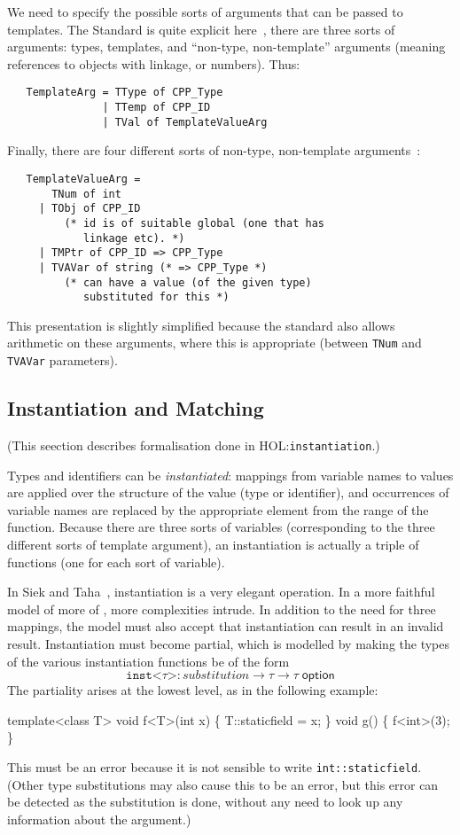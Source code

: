 \documentclass[11pt]{article}
\newcommand{\HOLfile}[1]{HOL:\texttt{#1}}
\begin{document}
We need to specify the possible sorts of arguments that can be passed
to templates.  The Standard is quite explicit
here~\cite[\S14.3~para~1]{cpp-standard-iso14882}, there are three
sorts of arguments: types, templates, and ``non-type, non-template''
arguments (meaning references to objects with linkage, or numbers).
Thus:
\begin{verbatim}
   TemplateArg = TType of CPP_Type
               | TTemp of CPP_ID
               | TVal of TemplateValueArg
\end{verbatim}
Finally, there are four different sorts of non-type, non-template
arguments~\cite[\S14.3.2~para~1]{cpp-standard-iso14882}:
\begin{verbatim}
   TemplateValueArg =
       TNum of int
     | TObj of CPP_ID
         (* id is of suitable global (one that has
            linkage etc). *)
     | TMPtr of CPP_ID => CPP_Type
     | TVAVar of string (* => CPP_Type *)
         (* can have a value (of the given type)
            substituted for this *)
\end{verbatim}
This presentation is slightly simplified because the standard also
allows arithmetic on these arguments, where this is appropriate
(between \texttt{TNum} and \texttt{TVAVar} parameters).

\subsection{Instantiation and Matching}

(This seection describes formalisation done in
\HOLfile{instantiation}.)

\medskip
\noindent Types and identifiers can be \emph{instantiated}: mappings
from variable names to values are applied over the structure of the
value (type or identifier), and occurrences of variable names are
replaced by the appropriate element from the range of the function.
Because there are three sorts of variables (corresponding to the three
different sorts of template argument), an instantiation is actually a
triple of functions (one for each sort of variable).

In Siek and Taha~\cite{DBLP:conf/ecoop/SiekT06}, instantiation is a
very elegant operation.  In a more faithful model of more of \cpp,
more complexities intrude.  In addition to the need for three
mappings, the model must also accept that instantiation can result in
an invalid result.  Instantiation must become partial, which is
modelled by making the types of the various instantiation functions be
of the form
\[
\texttt{inst<}\tau\texttt{>} : \mathit{substitution} \to \tau
\to \tau\;\textsf{option}
\]
The partiality arises at the lowest level, as in the following
example:
\begin{stdrule}
   template<class T> void f<T>(int x) \{ T::staticfield = x; \}
   void g() \{ f<int>(3); \}
\end{stdrule}
This must be an error because it is not sensible to write
\texttt{int::staticfield}.  (Other type substitutions may also cause
this to be an error, but this error can be detected as the
substitution is done, without any need to look up any information
about the argument.)
\end{document}
